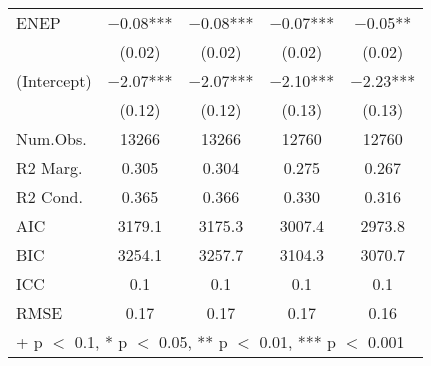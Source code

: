 \begin{table}
\begin{tabular}[t]{lcccc}
ENEP & \num{-0.08}*** & \num{-0.08}*** & \num{-0.07}*** & \num{-0.05}**\\
 & (\num{0.02}) & (\num{0.02}) & (\num{0.02}) & (\num{0.02})\\
(Intercept) & \num{-2.07}*** & \num{-2.07}*** & \num{-2.10}*** & \num{-2.23}***\\
 & (\num{0.12}) & (\num{0.12}) & (\num{0.13}) & (\num{0.13})\\
\midrule
Num.Obs. & \num{13266} & \num{13266} & \num{12760} & \num{12760}\\
R2 Marg. & \num{0.305} & \num{0.304} & \num{0.275} & \num{0.267}\\
R2 Cond. & \num{0.365} & \num{0.366} & \num{0.330} & \num{0.316}\\
AIC & \num{3179.1} & \num{3175.3} & \num{3007.4} & \num{2973.8}\\
BIC & \num{3254.1} & \num{3257.7} & \num{3104.3} & \num{3070.7}\\
ICC & \num{0.1} & \num{0.1} & \num{0.1} & \num{0.1}\\
RMSE & \num{0.17} & \num{0.17} & \num{0.17} & \num{0.16}\\
\bottomrule
\multicolumn{5}{l}{\rule{0pt}{1em}+ p $<$ 0.1, * p $<$ 0.05, ** p $<$ 0.01, *** p $<$ 0.001}\\
\end{tabular}
\end{table}
